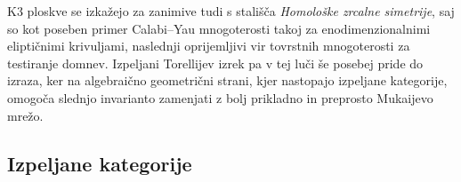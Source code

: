 %
%

K3 ploskve se izkažejo za zanimive tudi s stališča \emph{Homološke zrcalne simetrije}, saj so kot poseben primer Calabi--Yau mnogoterosti takoj za enodimenzionalnimi eliptičnimi krivuljami, naslednji oprijemljivi vir tovrstnih mnogoterosti za testiranje domnev. Izpeljani Torellijev izrek pa v tej luči še posebej pride do izraza, ker na algebraično geometrični strani, kjer nastopajo izpeljane kategorije, omogoča slednjo invarianto zamenjati z bolj prikladno in preprosto Mukaijevo mrežo.  

\subsection*{Izpeljane kategorije}

